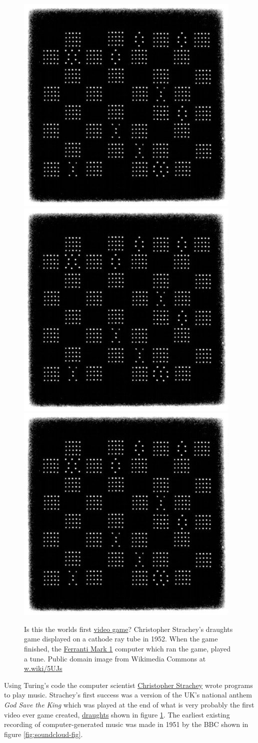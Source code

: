 \documentclass[
]{book}
\begin{document}
\begin{figure}
\includegraphics[width=0.33\linewidth]{images/draughts} \includegraphics[width=0.33\linewidth]{images/draughts} \includegraphics[width=0.33\linewidth]{images/draughts} \caption{Is this the worlds first \href{https://en.wikipedia.org/wiki/Video_game}{video game}? Christopher Strachey's draughts game displayed on a cathode ray tube in 1952. When the game finished, the \href{https://en.wikipedia.org/wiki/Ferranti_Mark_1}{Ferranti Mark 1} computer which ran the game, played a tune. Public domain image from Wikimedia Commons at \href{https://w.wiki/5UJs}{w.wiki/5UJs}}\label{fig:draughts-fig}
\end{figure}



Using Turing's code the computer scientist \href{https://en.wikipedia.org/wiki/Christopher_Strachey}{Christopher Strachey} wrote programs to play music. Strachey's first success was a version of the UK's national anthem \emph{God Save the King} \citep{godsavethequeen} which was played at the end of what is very probably the first video ever game created, \href{https://en.wikipedia.org/wiki/Checkers}{draughts} shown in figure \ref{fig:draughts-fig}. \citep{programmingenter} The earliest existing recording of computer-generated music was made in 1951 by the BBC shown in figure \ref{fig:soundcloud-fig}.
\end{document}
